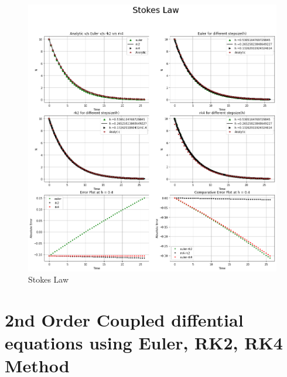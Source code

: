 \documentclass{article}
\begin{document}
\newpage
\begin{figure}[h]
    \centering
    \includegraphics[width=14cm,height=12cm \textwidth]{Euler/stokes.png}
\caption{Stokes Law}
\end{figure}
\newpage
\section{2nd Order Coupled diffential equations using Euler, RK2, RK4 Method}

\end{document}
